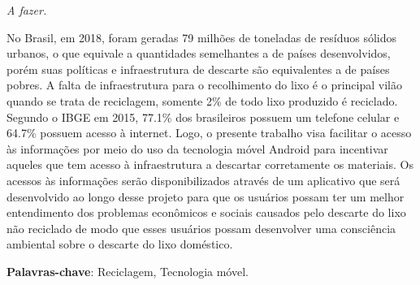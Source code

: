 \documentclass[
	12pt,				%
	openany,			%
	twoside,			%
	a4paper,			%
	english,			%
	french,				%
	spanish,			%
	brazil				%
	]{abntex2}
\begin{document}
\begin{dedicatoria}
   \vspace*{\fill}
   \centering
   \noindent
   \textit{ A fazer.} \vspace*{\fill}
\end{dedicatoria}

\begin{agradecimentos}


\end{agradecimentos}





\setlength{\absparsep}{18pt} %
\begin{resumo}
No Brasil, em 2018, foram geradas 79 milhões de toneladas de resíduos sólidos urbanos, o que equivale a quantidades semelhantes a de países desenvolvidos, porém suas políticas e infraestrutura de descarte são equivalentes a de países pobres. A falta de infraestrutura para o recolhimento do lixo é o principal vilão quando se trata de reciclagem, somente 2\% de todo lixo produzido é reciclado.
	Segundo o IBGE em 2015, 77.1\% dos brasileiros possuem um telefone celular e 64.7\% possuem acesso à internet. Logo, o presente trabalho visa facilitar o acesso às informações por meio do uso da tecnologia móvel Android para incentivar aqueles que tem acesso à infraestrutura a descartar corretamente os materiais. Os acessos às informações serão disponibilizados através de um aplicativo que será desenvolvido ao longo desse projeto para que os usuários possam ter um melhor entendimento dos problemas econômicos e sociais causados pelo descarte do lixo não reciclado de modo que esses usuários possam desenvolver uma consciência ambiental sobre o descarte do lixo doméstico.


 \textbf{Palavras-chave}: Reciclagem, Tecnologia móvel.
\end{resumo}
\end{document}
